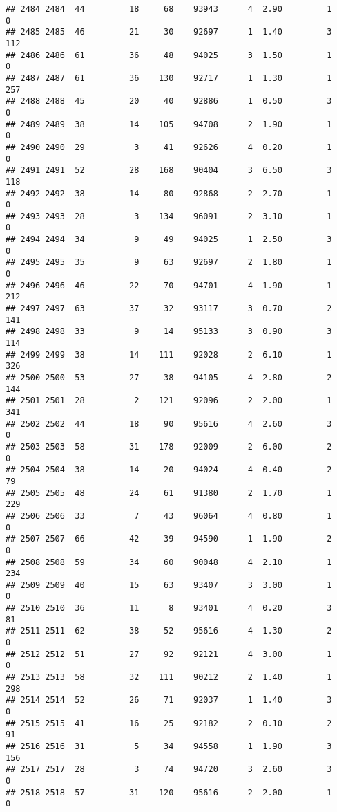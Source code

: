 \documentclass[
]{article}
\begin{document}
\begin{verbatim}
## 2484 2484  44         18     68    93943      4  2.90         1        0
## 2485 2485  46         21     30    92697      1  1.40         3      112
## 2486 2486  61         36     48    94025      3  1.50         1        0
## 2487 2487  61         36    130    92717      1  1.30         1      257
## 2488 2488  45         20     40    92886      1  0.50         3        0
## 2489 2489  38         14    105    94708      2  1.90         1        0
## 2490 2490  29          3     41    92626      4  0.20         1        0
## 2491 2491  52         28    168    90404      3  6.50         3      118
## 2492 2492  38         14     80    92868      2  2.70         1        0
## 2493 2493  28          3    134    96091      2  3.10         1        0
## 2494 2494  34          9     49    94025      1  2.50         3        0
## 2495 2495  35          9     63    92697      2  1.80         1        0
## 2496 2496  46         22     70    94701      4  1.90         1      212
## 2497 2497  63         37     32    93117      3  0.70         2      141
## 2498 2498  33          9     14    95133      3  0.90         3      114
## 2499 2499  38         14    111    92028      2  6.10         1      326
## 2500 2500  53         27     38    94105      4  2.80         2      144
## 2501 2501  28          2    121    92096      2  2.00         1      341
## 2502 2502  44         18     90    95616      4  2.60         3        0
## 2503 2503  58         31    178    92009      2  6.00         2        0
## 2504 2504  38         14     20    94024      4  0.40         2       79
## 2505 2505  48         24     61    91380      2  1.70         1      229
## 2506 2506  33          7     43    96064      4  0.80         1        0
## 2507 2507  66         42     39    94590      1  1.90         2        0
## 2508 2508  59         34     60    90048      4  2.10         1      234
## 2509 2509  40         15     63    93407      3  3.00         1        0
## 2510 2510  36         11      8    93401      4  0.20         3       81
## 2511 2511  62         38     52    95616      4  1.30         2        0
## 2512 2512  51         27     92    92121      4  3.00         1        0
## 2513 2513  58         32    111    90212      2  1.40         1      298
## 2514 2514  52         26     71    92037      1  1.40         3        0
## 2515 2515  41         16     25    92182      2  0.10         2       91
## 2516 2516  31          5     34    94558      1  1.90         3      156
## 2517 2517  28          3     74    94720      3  2.60         3        0
## 2518 2518  57         31    120    95616      2  2.00         1        0

\end{verbatim}
\end{document}
